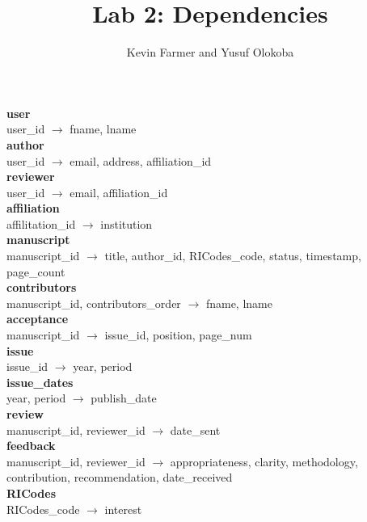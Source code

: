 \documentclass{article}
\title{Lab 2: Dependencies}
\author{Kevin Farmer and Yusuf Olokoba}
\newcommand{\ra}{$\rightarrow$ }
\begin{document}
\maketitle


\textbf{user} \\
user\_id \ra fname, lname \\

\textbf{author} \\
user\_id \ra email, address, affiliation\_id \\

\textbf{reviewer} \\
user\_id \ra email, affiliation\_id \\

\textbf{affiliation} \\
affilitation\_id \ra institution \\

\textbf{manuscript} \\
manuscript\_id \ra title, author\_id, RICodes\_code, status, timestamp, page\_count \\

\textbf{contributors} \\
manuscript\_id, contributors\_order \ra fname, lname \\

\textbf{acceptance} \\
manuscript\_id \ra issue\_id, position, page\_num \\

\textbf{issue} \\
issue\_id \ra year, period \\

\textbf{issue\_dates} \\
year, period \ra publish\_date \\

\textbf{review} \\
manuscript\_id, reviewer\_id \ra date\_sent \\

\textbf{feedback} \\
manuscript\_id, reviewer\_id \ra appropriateness, clarity, methodology, contribution, recommendation, date\_received \\

\textbf{RICodes} \\
RICodes\_code \ra interest \\
\end{document}
